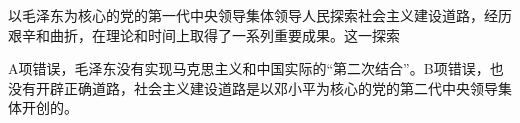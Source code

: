 \question 以毛泽东为核心的党的第一代中央领导集体领导人民探索社会主义建设道路，经历艰辛和曲折，在理论和时间上取得了一系列重要成果。这一探索
\par{}
\begin{solution}A项错误，毛泽东没有实现马克思主义和中国实际的``第二次结合''。B项错误，也没有开辟正确道路，社会主义建设道路是以邓小平为核心的党的第二代中央领导集体开创的。
\end{solution}
